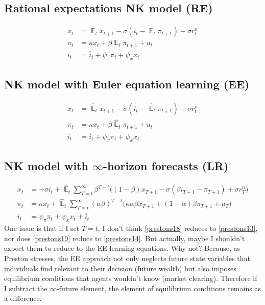 \documentclass[11pt]{article}
\renewcommand{\[}{\begin{equation}}
\renewcommand{\]}{\end{equation}}
\DeclareMathOperator{\E}{\mathbb{E}}
\begin{document}
\subsection{Rational expectations NK model (RE)}
\begin{align}
x_t &= \E_t x_{t+1} - \sigma(i_t - \E_t \pi_{t+1}) +\sigma r_t^n \label{NKIS} \\
\pi_t &= \kappa x_t +\beta \E_t \pi_{t+1} + u_t  \label{NKPC} \\
i_t &= \bar{i}_t + \psi_{\pi}\pi_t + \psi_{x} x_t  \label{TR}
\end{align}
\subsection{NK model with Euler equation learning (EE)}
\begin{align}
x_t &= \hat{\E}_t x_{t+1} - \sigma(i_t - \hat{\E}_t \pi_{t+1}) +\sigma r_t^n \tag{Preston, eq. (13)} \label{prestons13} \\
\pi_t &= \kappa x_t +\beta \hat{\E}_t \pi_{t+1} + u_t \tag{Preston, eq. (14)} \label{prestons14}  \\
i_t &= \bar{i}_t + \psi_{\pi}\pi_t + \psi_{x} x_t \tag{Preston, eq. (27) } 
\end{align}
\subsection{NK model with $\infty$-horizon forecasts (LR)}
\begin{align}
x_t &=  -\sigma i_t +\hat{\E}_t \sum_{T=t}^{\infty} \beta^{T-t }\big( (1-\beta)x_{T+1} - \sigma(\beta i_{T+1} - \pi_{T+1}) +\sigma r_T^n \big) \tag{Preston, eq. (18)} \label{prestons18}  \\
\pi_t &= \kappa x_t +\hat{\E}_t \sum_{T=t}^{\infty} (\alpha\beta)^{T-t }\big( \kappa \alpha \beta x_{T+1} + (1-\alpha)\beta \pi_{T+1} + u_T\big)\tag{Preston, eq. (19)} \label{prestons19}  \\
i_t &= \psi_{\pi}\pi_t + \psi_{x} x_t + \bar{i}_t \tag{Preston, eq. (27)} 
\end{align}
One issue is that if I set $T=t$, I don't think \ref{prestons18} reduces to \ref{prestons13}, nor does \ref{prestons19} reduce to \ref{prestons14}. But actually, maybe I shouldn't expect them to reduce to the EE learning equations. Why not? Because, as Preston stresses, the EE approach not only neglects future state variables that individuals find relevant to their decision (future wealth) but also imposes equilibrium conditions that agents wouldn't know (market clearing). Therefore if I subtract the $\infty$-future element, the element of equilibrium conditions remains as a difference.
\end{document}

